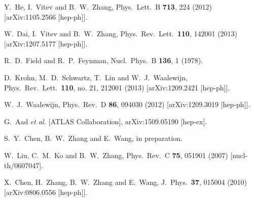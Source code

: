 \documentclass[3p,times,twocolumn]{elsarticle}
\begin{document}
\begin{thebibliography}{}
  Y.~He, I.~Vitev and B.~W.~Zhang,
  Phys.\ Lett.\ B {\bf 713}, 224 (2012)
  [arXiv:1105.2566 [hep-ph]].


  W.~Dai, I.~Vitev and B.~W.~Zhang,
  Phys.\ Rev.\ Lett.\  {\bf 110}, 142001 (2013)
  [arXiv:1207.5177 [hep-ph]].

  R.~D.~Field and R.~P.~Feynman,
  Nucl.\ Phys.\ B {\bf 136}, 1 (1978).



  D.~Krohn, M.~D.~Schwartz, T.~Lin and W.~J.~Waalewijn,
  Phys.\ Rev.\ Lett.\  {\bf 110}, no. 21, 212001 (2013)
  [arXiv:1209.2421 [hep-ph]].


  W.~J.~Waalewijn,
  Phys.\ Rev.\ D {\bf 86}, 094030 (2012)
  [arXiv:1209.3019 [hep-ph]].


  G.~Aad {\it et al.} [ATLAS Collaboration],
  arXiv:1509.05190 [hep-ex].

S.~Y.~Chen, B.~W.~Zhang and E.~Wang, in preparation.



  W.~Liu, C.~M.~Ko and B.~W.~Zhang,
  Phys.\ Rev.\ C {\bf 75}, 051901 (2007)
  [nucl-th/0607047].

  X.~Chen, H.~Zhang, B.~W.~Zhang and E.~Wang,
  J.\ Phys.\  {\bf 37}, 015004 (2010)
  [arXiv:0806.0556 [hep-ph]].


\end{thebibliography}
\end{document}
